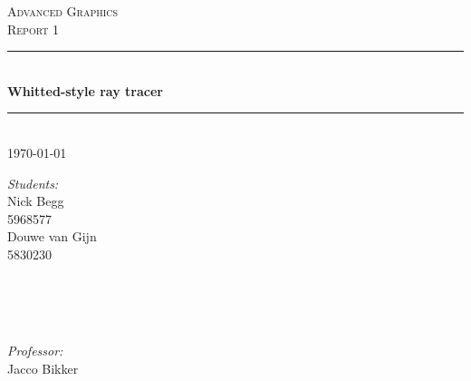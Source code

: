 \documentclass[a4paper,12pt]{article}
\newcommand{\vak}{Advanced Graphics}
\newcommand{\type}{Report 1}
\newcommand{\titel}{Whitted-style ray tracer}
\newcommand{\studentA}{Nick Begg}
\newcommand{\uvanetidA}{5968577}
\newcommand{\studentB}{Douwe van Gijn}
\newcommand{\uvanetidB}{5830230}
\newcommand{\docent}{Jacco Bikker}
\newcommand{\datum}{\today}
\begin{document}
\thispagestyle{firststyle}
\begin{center}
	\textsc{\LARGE \vak}\\[1cm]
	\textsc{\huge \type}\\[0.5cm]
		\rule{\linewidth}{0.5pt} \\[0.5cm]
			{\huge \bfseries \titel}
		\rule{\linewidth}{0.5pt} \\[0.5cm]
	{\large \datum\\[1.5cm]}
	
	\begin{minipage}{0.4\textwidth}
		\begin{flushleft} 
			\emph{Students:}\\[0.1cm]
			{\studentA\\ {\uvanetidA\\[0.2cm]}}
			{\studentB\\ {\uvanetidB\\[0.2cm]}}
			{\studentC\\ {\uvanetidC\\[0.2cm]}}
		\end{flushleft}
	\end{minipage}~%
	\begin{minipage}{0.4\textwidth}
		\begin{flushright} 
			\emph{Professor:} \\[0.1cm]
			\docent\\[0.2cm]
		\end{flushright}
	\end{minipage}\\[1.5 cm]
\end{center}

\newpage

\end{document}
